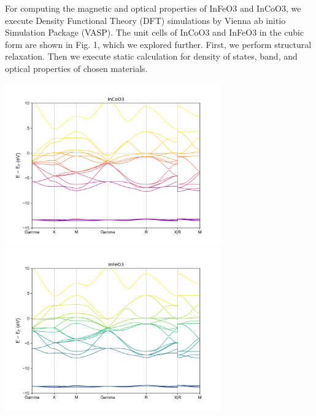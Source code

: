 \documentclass[12pt, letterpaper]{article}
\newcommand*{\1}{\hspace{1pt}}
\begin{document}
    For computing the magnetic and optical properties of InFeO3 and InCoO3, we execute Density Functional Theory (DFT)\cite{r5,r6,r7,r8} simulations by  Vienna ab initio Simulation 
    Package (VASP)\cite{r9,r10,r11}. The unit cells of InCoO3 and InFeO3 in the cubic form are shown in Fig. 1, which we explored further. First, we perform structural relaxation. 
    Then we execute static calculation for density of states, band, and optical properties of chosen materials. 
    
%
            

    \begin{adjustbox}{center,caption={Band Structure Of InCoO3 and InFeO3},label={somelabel},nofloat=figure,vspace=\bigskipamount}
        \includegraphics[width=0.7\textwidth]{bandCo}
        \includegraphics[width=0.7\textwidth]{bandFe}
    \end{adjustbox}
\end{document}
